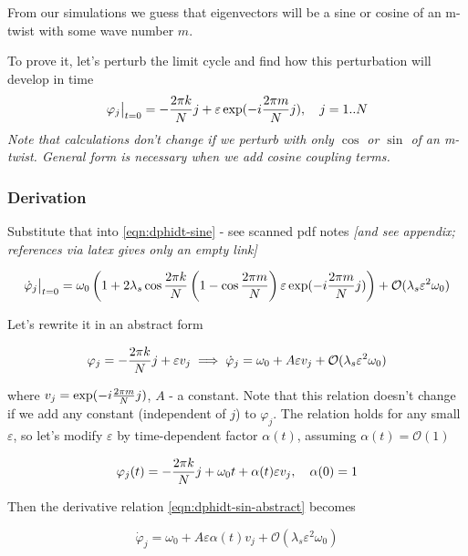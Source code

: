 \documentclass[a4paper,12pt]{article}
\newcommand*{\eps}{\varepsilon}
\newcommand*{\bigO}{\mathcal{O}}
\begin{document}
From our simulations we guess that eigenvectors will be a sine or cosine of an m-twist with some wave number $m$.

To prove it, let's perturb the limit cycle and find how this perturbation will develop in time
$$
\varphi_j \big\rvert_{t=0} = - \fr{k}{j} + \eps \exp( - i \fr{m}{j}), \quad j=1..N
$$
\textit{
Note that calculations don't change if we perturb with only $\cos$ or $\sin$ of an m-twist. General form is necessary when we add cosine coupling terms.
}

\subsubsection{Derivation}

Substitute that into \eqref{eqn:dphidt-sine} - see scanned pdf notes \textit{[and see appendix; references via latex gives only an empty link]}

\begin{equation}
\dot \varphi_j \big\rvert_{t=0} = 
\omega_0 \left( 1 +  2 \lambda_s  \co{k}{} \left(1 - \co{m}{} \right) \eps \exp( - i \fr{m}{j}) \right)  
+ \bigO(\lambda_s \eps ^2 \omega_0)
\end{equation}

Let's rewrite it in an abstract form

\begin{equation}
 \varphi_j = -  \fr{k}{j}  + \eps  v_j \implies 
\dot \varphi_j =  \omega_0 + A \eps  v_j + \bigO(\lambda_s \eps ^2 \omega_0)
\label{eqn:dphidt-sin-abstract}
\end{equation}

where $v_j =\exp( - i \frac{2 \pi m} {N} j)$, $A$ - a constant. Note that this relation doesn't change if we add any constant (independent of $j$) to $\varphi_j$. The relation holds for any small $\eps$, so let's modify $\eps$ by time-dependent factor $\alpha(t)$, assuming $\alpha(t) = \bigO(1)$

\begin{equation}
\varphi_j(t) = -  \fr{k}{j} + \omega_0 t + \alpha(t) \eps v_j, \quad \alpha(0) = 1
\label{eqn:phi-sin-ansatz2}
\end{equation}

Then the derivative relation \eqref{eqn:dphidt-sin-abstract} becomes

\begin{equation}
\dot \varphi_j  = \omega_0 + A \eps \alpha(t)  v_j + \bigO(\lambda_s \eps ^2  \omega_0)
\end{equation}
\end{document}

